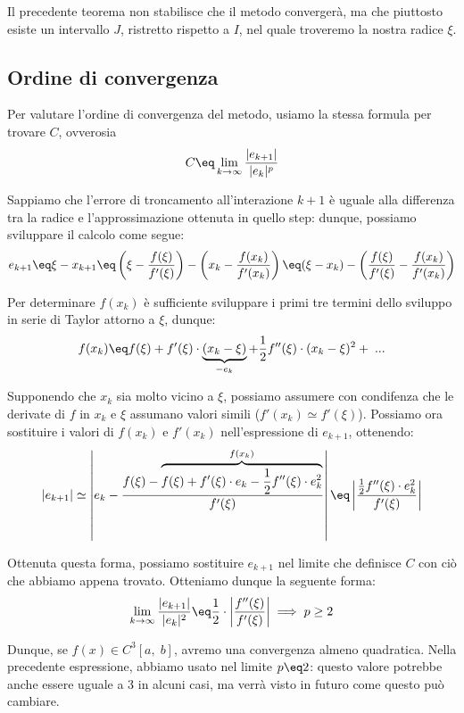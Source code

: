 Il precedente teorema non stabilisce che il metodo convergerà, ma che piuttosto esiste un intervallo $J$, ristretto rispetto a $I$, nel quale troveremo la nostra radice $\xi$.

\subsection{Ordine di convergenza}

Per valutare l'ordine di convergenza del metodo, usiamo la stessa formula per trovare $C$, ovverosia
\[ C \eq \lim_{k \to \infty} \frac{|e_{k + 1}|}{|e_k|^p} \]

Sappiamo che l'errore di troncamento all'interazione $k + 1$ è uguale alla differenza tra la radice e l'approssimazione ottenuta in quello step: dunque, possiamo sviluppare il calcolo come segue:
\[ e_{k + 1} \eq \xi - x_{k + 1} \eq \left(\xi - \frac{f(\xi)}{f'(\xi)}\right) - \left(x_k - \frac{f(x_k)}{f'(x_k)}\right) \eq (\xi - x_k) - \left(\frac{f(\xi)}{f'(\xi)} - \frac{f(x_k)}{f'(x_k)}\right) \]

Per determinare $f(x_k)$ è sufficiente sviluppare i primi tre termini dello sviluppo in serie di Taylor attorno a $\xi$, dunque:
\[ f(x_k) \eq f(\xi) + f'(\xi) \cdot \underbrace{(x_k - \xi)}_{-e_k} + \frac{1}{2} f''(\xi) \cdot (x_k - \xi)^2 + \; ... \]

Supponendo che $x_k$ sia molto vicino a $\xi$, possiamo assumere con condifenza che le derivate di $f$ in $x_k$ e $\xi$ assumano valori simili ($f'(x_k) \simeq f'(\xi)$). Possiamo ora sostituire i valori di $f(x_k)$ e $f'(x_k)$ nell'espressione di $e_{k + 1}$, ottenendo:
\[ |e_{k + 1}| \simeq \left\lvert e_k - \frac{f(\xi) - \overbrace{f(\xi) + f'(\xi) \cdot e_k - \frac{1}{2} f''(\xi) \cdot e_k^2}^{f(x_k)}}{f'(\xi)} \right\rvert \eq \left\lvert \frac{\frac{1}{2} f''(\xi) \cdot e_k^2}{f'(\xi)} \right\rvert \]

Ottenuta questa forma, possiamo sostituire $e_{k + 1}$ nel limite che definisce $C$ con ciò che abbiamo appena trovato. Otteniamo dunque la seguente forma:
\[ \lim_{k \to \infty} \frac{|e_{k + 1}|}{|e_k|^2} \eq \frac{1}{2} \cdot \left\lvert \frac{f''(\xi)}{f'(\xi)} \right\rvert \; \Longrightarrow \; p \geq 2 \]

Dunque, se $f(x) \in C^3 [a, \; b]$, avremo una convergenza almeno quadratica. Nella precedente espressione, abbiamo usato nel limite $p \eq 2$: questo valore potrebbe anche essere uguale a 3 in alcuni casi, ma verrà visto in futuro come questo può cambiare.

